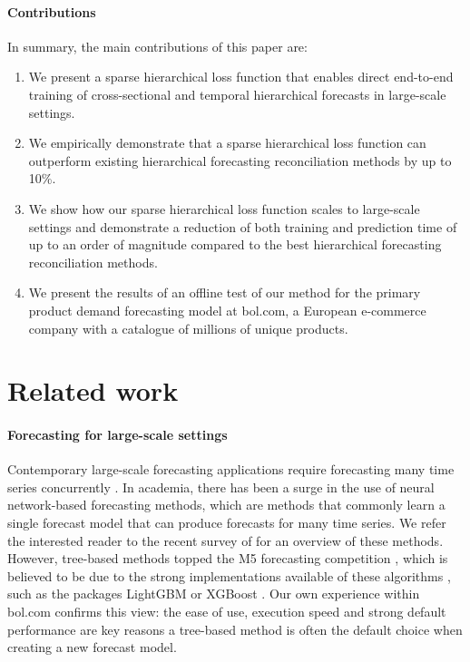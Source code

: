 \documentclass[preprint, 3p, times, twocolumn]{elsarticle}
\begin{document}
\paragraph{Contributions} In summary, the main contributions of this paper are:
\begin{enumerate}
  \item We present a sparse hierarchical loss function that enables direct end-to-end training of cross-sectional and temporal hierarchical forecasts in large-scale settings.
  \item We empirically demonstrate that a sparse hierarchical loss function can outperform existing hierarchical forecasting reconciliation methods by up to 10\%.
  \item We show how our sparse hierarchical loss function scales to large-scale settings and demonstrate a reduction of both training and prediction time of up to an order of magnitude compared to the best hierarchical forecasting reconciliation methods.
  \item We present the results of an offline test of our method for the primary product demand forecasting model at bol.com, a European e-commerce company with a catalogue of millions of unique products.
\end{enumerate}

\section{Related work} \label{sec:relwork}

\paragraph{Forecasting for large-scale settings} Contemporary large-scale forecasting applications require forecasting many time series concurrently \cite{bose_probabilistic_2017}. In academia, there has been a surge in the use of neural network-based forecasting methods, which are methods that commonly learn a single forecast model that can produce forecasts for many time series. We refer the interested reader to the recent survey of \citet{benidis_deep_2023} for an overview of these methods. However, tree-based methods topped the M5 forecasting competition \cite{makridakis_m5_2022}, which is believed to be due to the strong implementations available of these algorithms \cite{januschowski_forecasting_2022}, such as the packages LightGBM \cite{ke_lightgbm_2017} or XGBoost \cite{chen_xgboost_2016}. Our own experience within bol.com confirms this view: the ease of use, execution speed and strong default performance are key reasons a tree-based method is often the default choice when creating a new forecast model.
\end{document}
